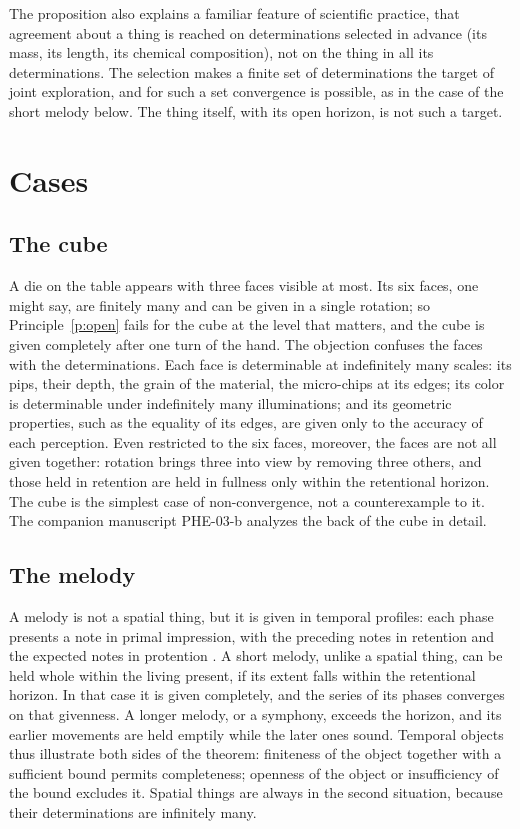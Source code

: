 \documentclass{situationist-preprint}
\begin{document}
The proposition also explains a familiar feature of scientific practice, that agreement about a thing is reached on determinations selected in advance (its mass, its length, its chemical composition), not on the thing in all its determinations. The selection makes a finite set of determinations the target of joint exploration, and for such a set convergence is possible, as in the case of the short melody below. The thing itself, with its open horizon, is not such a target.

\section{Cases}\label{s:cases}

\subsection{The cube}

A die on the table appears with three faces visible at most. Its six faces, one might say, are finitely many and can be given in a single rotation; so Principle~\ref{p:open} fails for the cube at the level that matters, and the cube is given completely after one turn of the hand. The objection confuses the faces with the determinations. Each face is determinable at indefinitely many scales: its pips, their depth, the grain of the material, the micro-chips at its edges; its color is determinable under indefinitely many illuminations; and its geometric properties, such as the equality of its edges, are given only to the accuracy of each perception. Even restricted to the six faces, moreover, the faces are not all given together: rotation brings three into view by removing three others, and those held in retention are held in fullness only within the retentional horizon. The cube is the simplest case of non-convergence, not a counterexample to it. The companion manuscript PHE-03-b analyzes the back of the cube in detail.

\subsection{The melody}

A melody is not a spatial thing, but it is given in temporal profiles: each phase presents a note in primal impression, with the preceding notes in retention and the expected notes in protention \citep{Husserl1966}. A short melody, unlike a spatial thing, can be held whole within the living present, if its extent falls within the retentional horizon. In that case it is given completely, and the series of its phases converges on that givenness. A longer melody, or a symphony, exceeds the horizon, and its earlier movements are held emptily while the later ones sound. Temporal objects thus illustrate both sides of the theorem: finiteness of the object together with a sufficient bound permits completeness; openness of the object or insufficiency of the bound excludes it. Spatial things are always in the second situation, because their determinations are infinitely many.
\end{document}
